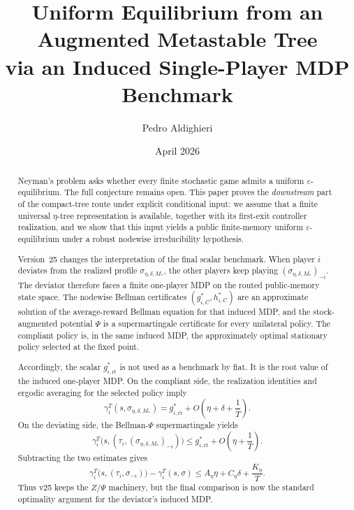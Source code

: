 \documentclass[12pt]{article}
\title{\textbf{Uniform Equilibrium from an Augmented Metastable Tree\\via an Induced Single-Player MDP Benchmark}}
\author{Pedro Aldighieri}
\date{April 2026}
\theoremstyle{definition}
\newcommand{\eps}{\varepsilon}
\newcommand{\1}{\mathbf{1}}
\begin{document}
\maketitle





\begin{abstract}
Neyman's problem asks whether every finite stochastic game admits a uniform
$\eps$-equilibrium. The full conjecture remains open. This paper proves the
\emph{downstream} part of the compact-tree route under explicit conditional input:
we assume that a finite universal $\eta$-tree representation is available,
together with its first-exit controller realization, and we show that this input
yields a public finite-memory uniform $\eps$-equilibrium under a robust
nodewise irreducibility hypothesis.

Version~25 changes the interpretation of the final scalar benchmark. When player
$i$ deviates from the realized profile $\sigma_{\eta,\delta,M_*}$, the other
players keep playing $(\sigma_{\eta,\delta,M_*})_{-i}$. The deviator therefore
faces a finite one-player MDP on the routed public-memory state space. The
nodewise Bellman certificates $(g_{i,C}^*,h_{i,C}^*)$ are an approximate
solution of the average-reward Bellman equation for that induced MDP, and the
stock-augmented potential $\Psi$ is a supermartingale certificate for every
unilateral policy. The compliant policy is, in the same induced MDP, the
approximately optimal stationary policy selected at the fixed point.

Accordingly, the scalar $g_{i,\mathrm{rt}}^*$ is not used as a benchmark by
fiat. It is the root value of the induced one-player MDP. On the compliant
side, the realization identities and ergodic averaging for the selected policy
imply
\[
\gamma_i^T(s,\sigma_{\eta,\delta,M_*})
=
g_{i,\mathrm{rt}}^*
+
O\!\left(\eta+\delta+\frac1T\right).
\]
On the deviating side, the Bellman-$\Psi$ supermartingale yields
\[
\gamma_i^T\bigl(s,(\tau_i,(\sigma_{\eta,\delta,M_*})_{-i})\bigr)
\le
g_{i,\mathrm{rt}}^*
+
O\!\left(\eta+\frac1T\right).
\]
Subtracting the two estimates gives
\[
\gamma_i^T\bigl(s,(\tau_i,\sigma_{-i})\bigr)-\gamma_i^T(s,\sigma)
\le
A_\eta\eta + C_\eta\delta + \frac{K_\eta}{T}.
\]
Thus v25 keeps the $Z/\Psi$ machinery, but the final comparison is now the
standard optimality argument for the deviator's induced MDP.
\end{abstract}
\end{document}
